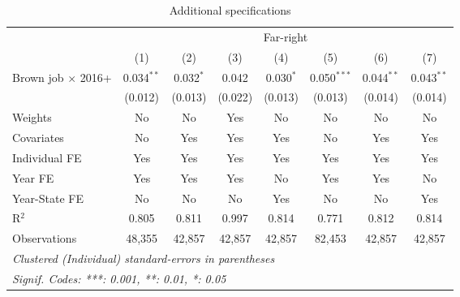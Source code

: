 
\begin{table}[htbp]
   \caption{Additional specifications}
   \centering
   \begin{tabular}{lccccccc}
      \tabularnewline \midrule \midrule
       & \multicolumn{7}{c}{Far-right}\\
                                & (1)          & (2)         & (3)     & (4)         & (5)           & (6)          & (7)\\  
      Brown job $\times$ 2016+  & 0.034$^{**}$ & 0.032$^{*}$ & 0.042   & 0.030$^{*}$ & 0.050$^{***}$ & 0.044$^{**}$ & 0.043$^{**}$\\   
                                & (0.012)      & (0.013)     & (0.022) & (0.013)     & (0.013)       & (0.014)      & (0.014)\\   
      Weights                   & No           & No          & Yes     & No          & No            & No           & No\\  
      Covariates                & No           & Yes         & Yes     & Yes         & No            & Yes          & Yes\\  
      Individual FE             & Yes          & Yes         & Yes     & Yes         & Yes           & Yes          & Yes\\  
      Year FE                   & Yes          & Yes         & Yes     & No          & Yes           & Yes          & No\\  
      Year-State FE             & No           & No          & No      & Yes         & No            & No           & Yes\\  
      R$^2$                     & 0.805        & 0.811       & 0.997   & 0.814       & 0.771         & 0.812        & 0.814\\  
      Observations              & 48,355       & 42,857      & 42,857  & 42,857      & 82,453        & 42,857       & 42,857\\  
      \midrule \midrule
      \multicolumn{8}{l}{\emph{Clustered (Individual) standard-errors in parentheses}}\\
      \multicolumn{8}{l}{\emph{Signif. Codes: ***: 0.001, **: 0.01, *: 0.05}}\\
   \end{tabular}
\end{table}



